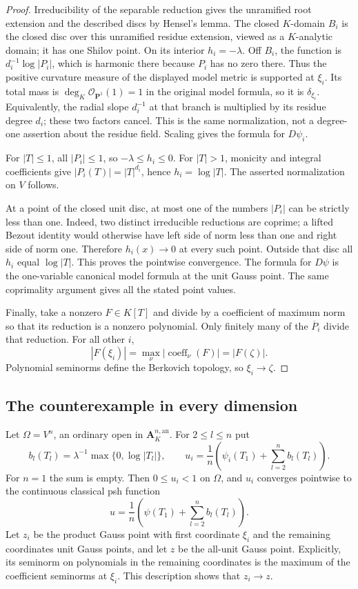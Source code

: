 \documentclass[11pt,a4paper]{article}
\numberwithin{equation}{section}
\theoremstyle{definition}
\theoremstyle{remark}
\newcommand{\an}{\mathrm{an}}
\begin{document}
\begin{proof}
Irreducibility of the separable reduction gives the unramified
root extension and the described discs by Hensel's lemma.
The closed $K$-domain $B_i$ is the closed disc over this
unramified residue extension, viewed as a $K$-analytic domain;
it has one Shilov point. On its interior $h_i=-\lambda$.
Off $B_i$, the function is $d_i^{-1}\log|P_i|$, which is
harmonic there because $P_i$ has no zero there. Thus the
positive curvature measure of the displayed model metric is
supported at $\xi_i$. Its total mass is
$\deg_K\mathcal O_{\mathbf P^1}(1)=1$ in the original model
formula, so it is $\delta_{\xi_i}$. Equivalently, the radial
slope $d_i^{-1}$ at that branch is multiplied by its residue
degree $d_i$; these two factors cancel. This is the same
normalization, not a degree-one assertion about the residue
field. Scaling gives the formula for $D\psi_i$.

For $|T|\leq1$, all $|P_i|\leq1$, so $-\lambda\leq h_i\leq0$.
For $|T|>1$, monicity and integral coefficients give
$|P_i(T)|=|T|^{d_i}$, hence $h_i=\log|T|$. The asserted
normalization on $V$ follows.

At a point of the closed unit disc, at most one of the numbers
$|P_i|$ can be strictly less than one. Indeed, two distinct
irreducible reductions are coprime; a lifted Bezout identity
would otherwise have left side of norm less than one and right
side of norm one. Therefore $h_i(x)\to0$ at every such point.
Outside that disc all $h_i$ equal $\log|T|$. This proves the
pointwise convergence. The formula for $D\psi$ is the
one-variable canonical model formula at the unit Gauss point.
The same coprimality argument gives all the stated point values.

Finally, take a nonzero $F\in K[T]$ and divide by a coefficient
of maximum norm so that its reduction is a nonzero polynomial.
Only finitely many of the $\overline P_i$ divide that
reduction. For all other $i$,
\[
 |F(\xi_i)|=\max_\nu|\operatorname{coeff}_\nu(F)|
           =|F(\zeta)|.
\]
Polynomial seminorms define the Berkovich topology, so
$\xi_i\to\zeta$.
\end{proof}

\subsection{The counterexample in every dimension}

Let $\Omega=V^n$, an ordinary open in $\mathbf A_K^{n,\an}$.
For $2\leq l\leq n$ put
\[
 b_l(T_l)=\lambda^{-1}\max\{0,\log|T_l|\},
 \qquad
 u_i=\frac1n\left(\psi_i(T_1)+\sum_{l=2}^n b_l(T_l)\right).
\]
For $n=1$ the sum is empty. Then $0\leq u_i<1$ on
$\Omega$, and $u_i$ converges pointwise to the continuous
classical psh function
\[
 u=\frac1n\left(\psi(T_1)+\sum_{l=2}^n b_l(T_l)\right).
\]
Let $z_i$ be the product Gauss point with first coordinate
$\xi_i$ and the remaining coordinates unit Gauss points, and
let $z$ be the all-unit Gauss point. Explicitly, its seminorm
on polynomials in the remaining coordinates is the maximum
of the coefficient seminorms at $\xi_i$. This description
shows that $z_i\to z$.
\end{document}
